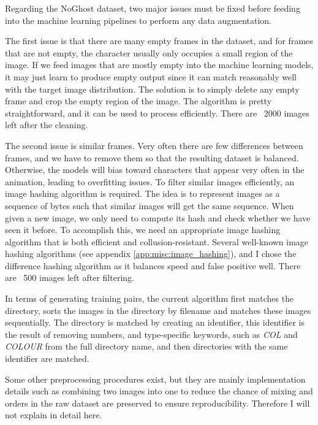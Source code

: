Regarding the NoGhost dataset, two major issues must be fixed before feeding into the machine learning pipelines to perform any data augmentation. 

The first issue is that there are many empty frames in the dataset, and for frames that are not empty, the character usually only occupies a small region of the image. If we feed images that are mostly empty into the machine learning models, it may just learn to produce empty output since it can match reasonably well with the target image distribution. The solution is to simply delete any empty frame and crop the empty region of the image. The algorithm is pretty straightforward, and it can be used to process efficiently. There are ~2000 images left after the cleaning.

The second issue is similar frames. Very often there are few differences between frames, and we have to remove them so that the resulting dataset is balanced. Otherwise, the models will bias toward characters that appear very often in the animation, leading to overfitting issues. To filter similar images efficiently, an image hashing algorithm is required. The idea is to represent images as a sequence of bytes such that similar images will get the same sequence. When given a new image, we only need to compute its hash and check whether we have seen it before. To accomplish this, we need an appropriate image hashing algorithm that is both efficient and collusion-resistant. Several well-known image hashing algorithms (see appendix \ref{app:misc:image_hashing}), and I chose the difference hashing algorithm as it balances speed and false positive well. There are ~500 images left after filtering.

In terms of generating training pairs, the current algorithm first matches the directory, sorts the images in the directory by filename and matches these images sequentially. The directory is matched by creating an identifier, this identifier is the result of removing numbers, and type-specific keywords, such as \textit{COL} and \textit{COLOUR} from the full directory name, and then directories with the same identifier are matched.

Some other preprocessing procedures exist, but they are mainly implementation details such as combining two images into one to reduce the chance of mixing and orders in the raw dataset are preserved to ensure reproducibility. Therefore I will not explain in detail here.

